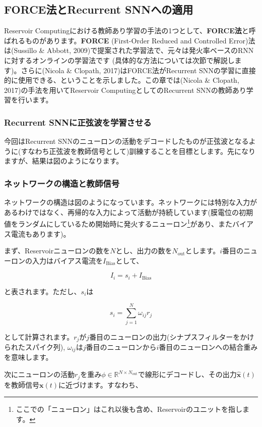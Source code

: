 \subsection{FORCE法とRecurrent SNNへの適用}
Reservoir Computingにおける教師あり学習の手法の1つとして、\textbf{FORCE法}と呼ばれるものがあります。\textbf{FORCE} (First-Order Reduced and Controlled Error)法は(Sussillo \& Abbott, 2009)で提案された学習法で、元々は発火率ベースのRNNに対するオンラインの学習法です (具体的な方法については次節で解説します)。さらに(Nicola \& Clopath, 2017)はFORCE法がRecurrent SNNの学習に直接的に使用できる、ということを示しました。この章では(Nicola \& Clopath, 2017)の手法を用いてReservoir ComputingとしてのRecurrent SNNの教師あり学習を行います。
\subsubsection{Recurrent SNNに正弦波を学習させる}
今回はRecurrent SNNのニューロンの活動をデコードしたものが正弦波となるように(すなわち正弦波を教師信号として)訓練することを目標とします。先になりますが、結果は図のようになります。

\subsubsection{ネットワークの構造と教師信号}
ネットワークの構造は図のようになっています。ネットワークには特別な入力があるわけではなく、再帰的な入力によって活動が持続しています(膜電位の初期値をランダムにしているため開始時に発火するニューロン\footnote{ここでの「ニューロン」はこれ以後も含め、Reservoirのユニットを指します。}があり、またバイアス電流もあります)。\par
まず、Reservoirニューロンの数を$N$とし、出力の数を$N_\text{out}$とします。$i$番目のニューロンの入力はバイアス電流を$I_{\text{Bias}}$として、


\begin{equation}
I_i=s_i+I_{\text{Bias}}    
\end{equation}


と表されます。ただし、$s_i$は 


\begin{equation}
s_{i}=\sum_{j=1}^{N} \omega_{i j} r_{j}    
\end{equation}


として計算されます。$r_j$が$j$番目のニューロンの出力(シナプスフィルターをかけられたスパイク列), $\omega_{i j}$は$j$番目のニューロンから$i$番目のニューロンへの結合重みを意味します。\par
次にニューロンの活動$r_j$を重み$\phi\in \mathbb{R}^{N\times N_\text{out}}$で線形にデコードし、その出力$\hat{\boldsymbol{x}}(t)$を教師信号$\boldsymbol{x}(t)$に近づけます。すなわち、


